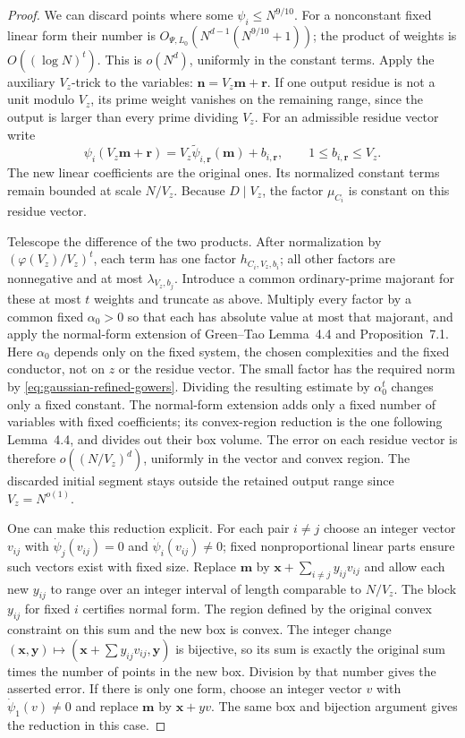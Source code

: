 \documentclass[11pt]{article}
\theoremstyle{definition}
\theoremstyle{remark}
\begin{document}
\begin{proof}
We can discard points where some $\psi_i\leq N^{9/10}$.
For a nonconstant fixed linear form their number is
$O_{\Psi,L_0}(N^{d-1}(N^{9/10}+1))$; the product of weights is
$O((\log N)^t)$. This is $o(N^d)$, uniformly in the constant terms.
Apply the auxiliary $V_z$-trick to the variables:
$\mathbf n=V_z\mathbf m+\mathbf r$.
If one output residue is not a unit modulo $V_z$, its prime weight
vanishes on the remaining range, since the output is larger than
every prime dividing $V_z$. For an admissible residue vector write
\[
 \psi_i(V_z\mathbf m+\mathbf r)
       =V_z\widetilde\psi_{i,\mathbf r}(\mathbf m)+b_{i,\mathbf r},
       \qquad1\leq b_{i,\mathbf r}\leq V_z.
\]
The new linear coefficients are the original ones. Its normalized
constant terms remain bounded at scale $N/V_z$. Because $D\mid V_z$,
the factor $\mu_{C_i}$ is constant on this residue vector.

Telescope the difference of the two products. After normalization by
$(\varphi(V_z)/V_z)^t$, each term has one factor $h_{C_i,V_z,b_i}$;
all other factors are nonnegative and at most
$\lambda_{V_z,b_j}$. Introduce a common ordinary-prime majorant for
these at most $t$ weights and truncate as above. Multiply every
factor by a common fixed $\alpha_0>0$ so that each has absolute value
at most that majorant, and apply the normal-form extension of
Green--Tao Lemma~4.4 and Proposition~7.1. Here $\alpha_0$ depends
only on the fixed system, the chosen complexities and the fixed
conductor, not on $z$ or the residue vector. The small factor has
the required norm by \eqref{eq:gaussian-refined-gowers}. Dividing
the resulting estimate by $\alpha_0^t$ changes only a fixed constant.
The normal-form extension adds only a fixed number of variables with
fixed coefficients; its convex-region reduction is the one following
Lemma~4.4, and divides out their box volume. The error on each residue
vector is therefore $o((N/V_z)^d)$, uniformly in the vector and convex
region. The discarded initial segment stays outside the retained
output range since $V_z=N^{o(1)}$.

One can make this reduction explicit. For each pair $i\ne j$ choose
an integer vector $v_{ij}$ with $\dot\psi_j(v_{ij})=0$ and
$\dot\psi_i(v_{ij})\ne0$; fixed nonproportional linear parts ensure
such vectors exist with fixed size. Replace $\mathbf m$ by
$\mathbf x+\sum_{i\ne j}y_{ij}v_{ij}$ and allow each new $y_{ij}$
to range over an integer interval of length comparable to $N/V_z$.
The block $y_{ij}$ for fixed $i$ certifies normal form. The region
defined by the original convex constraint on this sum and the new box
is convex. The integer change $(\mathbf x,\mathbf y)\mapsto
(\mathbf x+\sum y_{ij}v_{ij},\mathbf y)$ is bijective, so its sum
is exactly the original sum times the number of points in the new box.
Division by that number gives the asserted error. If there is only one
form, choose an integer vector $v$ with $\dot\psi_1(v)\ne0$ and replace
$\mathbf m$ by $\mathbf x+yv$. The same box and bijection argument
gives the reduction in this case.


\end{proof}
\end{document}
